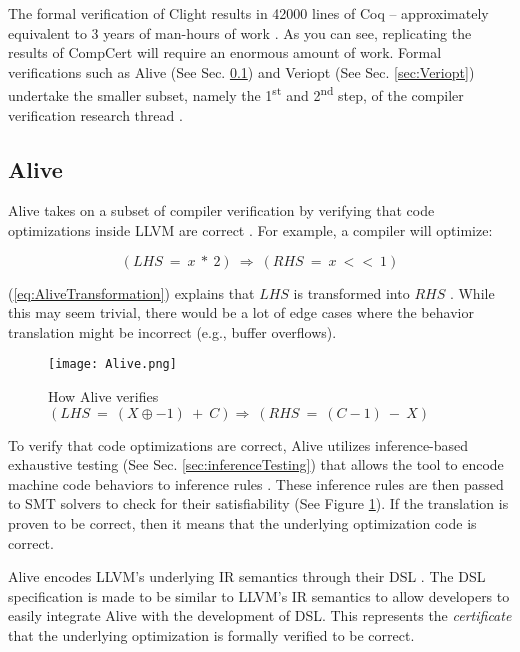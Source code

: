 The formal verification of Clight results in 42000 lines of Coq -- approximately equivalent to 3 years of man-hours 
of work \cite[Sec. 3.3]{compcertVerification}. As you can see, replicating the results of CompCert will require an enormous amount of work.
Formal verifications such as Alive (See Sec. \ref{sec:Alive}) and Veriopt (See Sec. \ref{sec:Veriopt}) undertake the smaller subset, 
namely the 1\textsuperscript{st} and 2\textsuperscript{nd} step, of the compiler verification research thread \cite{CompilerOptimization}.

\subsection{Alive}
\label{sec:Alive}

Alive takes on a subset of compiler verification by verifying that code optimizations inside LLVM are correct \cite{AliveInLean}. For example, 
a compiler will optimize:

\begin{equation}
    (LHS\ =\ x\ *\ 2)\ \Longrightarrow\ (RHS\ =\ x\ <<\ 1)
    \label{eq:AliveTransformation}
\end{equation}

(\ref{eq:AliveTransformation}) explains that \(LHS\) is transformed into \(RHS\) \cite[Sec. 2.1]{AliveInLean}.
While this may seem trivial, there would be a lot of edge cases where the behavior translation might be incorrect (e.g., buffer overflows).

\begin{figure}[ht]
    \centering
    \texttt{[image: Alive.png]}
    \caption{How Alive verifies \((LHS\ =\ (X \oplus -1)\ +\ C) \Longrightarrow \ (RHS\ =\ (C-1)\ -\ X)\) \cite[p. 1]{AliveInLean}}
    \label{fig:AliveSystem}
\end{figure}

To verify that code optimizations are correct, Alive utilizes inference-based exhaustive testing (See Sec. \ref{sec:inferenceTesting}) that allows 
the tool to encode machine code behaviors to inference rules \cite[Sec. 3.1.1]{AliveInLean}. These inference rules are then passed to SMT solvers 
to check for their satisfiability (See Figure \ref{fig:AliveSystem}). If the translation is proven to be correct, then it means that the underlying 
optimization code is correct.

Alive encodes LLVM's \cite{llvm} underlying IR semantics through their DSL \cite[Fig. 1]{AliveInLean}. The DSL specification is made to be 
similar to LLVM's IR semantics to allow developers to easily integrate Alive with the development of DSL. This represents the 
\emph{certificate} that the underlying optimization is formally verified to be correct.

